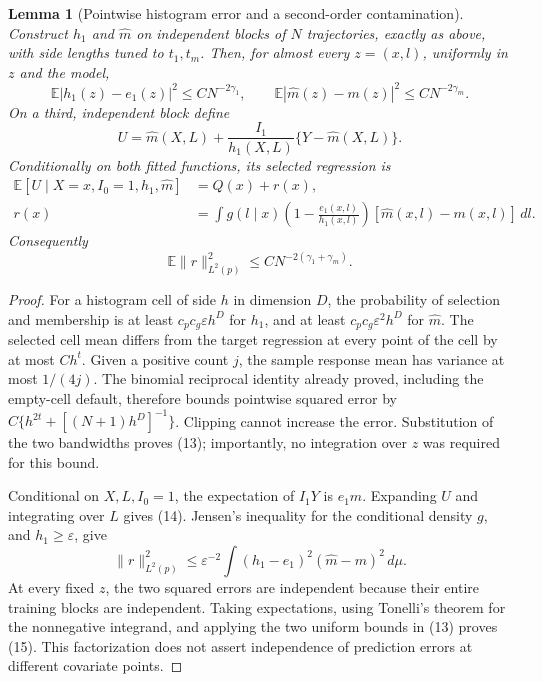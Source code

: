 \documentclass[11pt]{article}
\newtheorem{lemma}[theorem]{Lemma}
\theoremstyle{definition}
\begin{document}
\begin{lemma}[Pointwise histogram error and a second-order contamination]
Construct $h_1$ and $\widehat m$ on independent blocks of $N$
trajectories, exactly as above, with side lengths tuned to $t_1,t_m$.
Then, for almost every $z=(x,l)$, uniformly in $z$ and the model,
\[
 \mathbb E|h_1(z)-e_1(z)|^2\le C N^{-2\gamma_1},\qquad
 \mathbb E|\widehat m(z)-m(z)|^2\le C N^{-2\gamma_m}.
                                                        \tag{13}
\]
On a third, independent block define
\[
 U=\widehat m(X,L)+\frac{I_1}{h_1(X,L)}
                         \{Y-\widehat m(X,L)\}.
\]
Conditionally on both fitted functions, its selected regression is
\[
 \begin{aligned}
 \mathbb E[U\mid X=x,I_0=1,h_1,\widehat m]&=Q(x)+r(x),\\
 r(x)&=\int g(l\mid x)
       \left(1-\frac{e_1(x,l)}{h_1(x,l)}\right)
                        [\widehat m(x,l)-m(x,l)]\,dl.
 \end{aligned}                                          \tag{14}
\]
Consequently
\[
 \mathbb E\|r\|_{L^2(p)}^2
                  \le C N^{-2(\gamma_1+\gamma_m)}.       \tag{15}
\]
\end{lemma}
\begin{proof}
For a histogram cell of side $h$ in dimension $D$, the probability
of selection and membership is at least
$c_p c_g\varepsilon h^D$ for $h_1$, and at least
$c_p c_g\varepsilon^2h^D$ for $\widehat m$.
The selected cell mean differs from the target regression at every
point of the cell by at most $C h^t$. Given a positive count $j$, the
sample response mean has variance at most $1/(4j)$. The binomial
reciprocal identity already proved, including the empty-cell default,
therefore bounds pointwise squared error by
$C\{h^{2t}+[(N+1)h^D]^{-1}\}$. Clipping cannot increase the error.
Substitution of the two bandwidths proves (13); importantly, no
integration over $z$ was required for this bound.

Conditional on $X,L,I_0=1$, the expectation of $I_1Y$ is $e_1m$.
Expanding $U$ and integrating over $L$ gives (14). Jensen's inequality
for the conditional density $g$, and $h_1\ge\varepsilon$, give
\[
 \|r\|_{L^2(p)}^2\le\varepsilon^{-2}
  \int (h_1-e_1)^2(\widehat m-m)^2\,d\mu.
\]
At every fixed $z$, the two squared errors are independent because their
entire training blocks are independent. Taking expectations, using
Tonelli's theorem for the nonnegative integrand, and applying the two
uniform bounds in (13) proves (15). This factorization does not assert
independence of prediction errors at different covariate points.
\end{proof}
\end{document}

